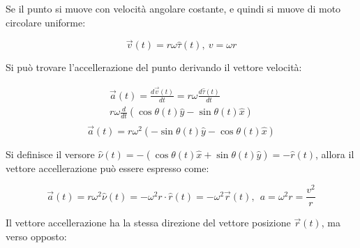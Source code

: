 \documentclass{article}
\numberwithin{equation}{subsection}
\begin{document}
\begin{center}\end{center}

Se il punto si muove con velocità angolare costante, e quindi si 
muove di moto circolare uniforme:

\begin{equation}
    \vec{v}(t)=r\omega\hat{\tau}(t){,}\:
    v=\omega r
\end{equation}

Si può trovare l'accellerazione del punto derivando il vettore 
velocità:

\begin{gather*}
    \vec{a}(t)=\displaystyle\frac{d\vec{v}(t)}{dt}=
    r\omega\frac{d\hat{\tau}(t)}{dt}\\
    r\omega\frac{d}{dt}(\cos\theta(t)\hat{y}-\sin\theta(t)\hat{x})\\
\end{gather*}
\begin{equation}
    \vec{a}(t)=    r\omega^{2}(-\sin\theta(t)\hat{y}-\cos\theta(t)\hat{x})
\end{equation}

Si definisce il versore $\hat{\nu}(t)=-(\cos\theta(t)\hat{x}+\sin\theta(t)\hat{y})=-\hat{r}(t)$, allora il vettore accellerazione può essere espresso come:

\begin{equation}
    \vec{a}(t)=r\omega^{2}\hat{\nu}(t)=-\omega^{2}r\cdot\hat{r}(t)=-\omega^{2}\vec{r}(t){,}\:\: a=\omega^{2}r=\displaystyle\frac{v^{2}}{r}
\end{equation}

Il vettore accellerazione ha la stessa direzione del vettore 
posizione $\vec{r}(t)$, ma verso opposto:
\end{document}
